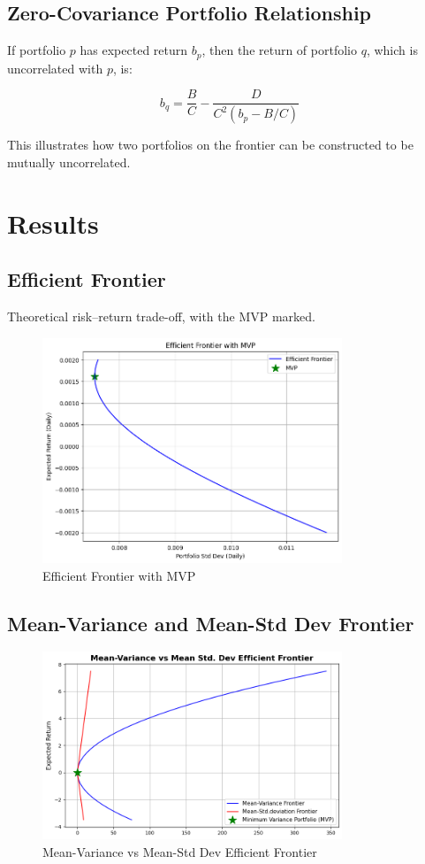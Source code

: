 \documentclass[12pt]{article}
\begin{document}
\subsection{Zero-Covariance Portfolio Relationship}

If portfolio $p$ has expected return $b_p$, then the return of portfolio $q$, which is uncorrelated with $p$, is:

\[
b_q = \frac{B}{C} - \frac{D}{C^2(b_p - B/C)}
\]

This illustrates how two portfolios on the frontier can be constructed to be mutually uncorrelated.

\section{Results}
\subsection{Efficient Frontier}

Theoretical risk–return trade-off, with the MVP marked.
\begin{figure}[H]
    \centering
    \includegraphics[width=0.8\textwidth]{5.png}
    \caption{Efficient Frontier with MVP}
    \label{fig:eff_frontier}
\end{figure}

\subsection{Mean-Variance and Mean-Std Dev Frontier}

\begin{figure}[H]
    \centering
    \includegraphics[width=0.8\textwidth]{1.png}
    \caption{Mean-Variance vs Mean-Std Dev Efficient Frontier}
    \label{fig:frontier_comparison}
\end{figure}
\end{document}
